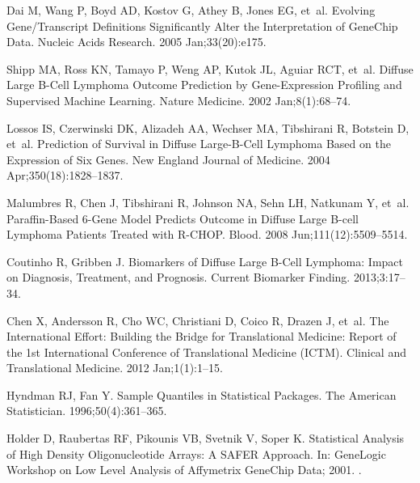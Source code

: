 \documentclass[10pt,letterpaper]{article}
\begin{document}
\begin{thebibliography}{10}
Dai M, Wang P, Boyd AD, Kostov G, Athey B, Jones EG, et~al.
\newblock Evolving {Gene/Transcript} Definitions Significantly Alter the
  Interpretation of {GeneChip} Data.
\newblock Nucleic Acids Research. 2005 Jan;33(20):e175.

Shipp MA, Ross KN, Tamayo P, Weng AP, Kutok JL, Aguiar RCT, et~al.
\newblock Diffuse Large {B}-Cell Lymphoma Outcome Prediction by Gene-Expression
  Profiling and Supervised Machine Learning.
\newblock Nature Medicine. 2002 Jan;8(1):68--74.

Lossos IS, Czerwinski DK, Alizadeh AA, Wechser MA, Tibshirani R, Botstein D,
  et~al.
\newblock Prediction of Survival in Diffuse Large-{B}-Cell Lymphoma Based on
  the Expression of Six Genes.
\newblock New England Journal of Medicine. 2004 Apr;350(18):1828--1837.

Malumbres R, Chen J, Tibshirani R, Johnson NA, Sehn LH, Natkunam Y, et~al.
\newblock Paraffin-Based 6-Gene Model Predicts Outcome in Diffuse Large
  {B}-cell Lymphoma Patients Treated with {R-CHOP}.
\newblock Blood. 2008 Jun;111(12):5509--5514.

Coutinho R, Gribben J.
\newblock Biomarkers of Diffuse Large {B}-Cell Lymphoma: Impact on Diagnosis,
  Treatment, and Prognosis.
\newblock Current Biomarker Finding. 2013;3:17--34.

Chen X, Andersson R, Cho WC, Christiani D, Coico R, Drazen J, et~al.
\newblock The International Effort: Building the Bridge for Translational
  Medicine: Report of the 1st International Conference of Translational
  Medicine {(ICTM)}.
\newblock Clinical and Translational Medicine. 2012 Jan;1(1):1--15.

Hyndman RJ, Fan Y.
\newblock Sample Quantiles in Statistical Packages.
\newblock The American Statistician. 1996;50(4):361--365.

Holder D, Raubertas RF, Pikounis VB, Svetnik V, Soper K.
\newblock Statistical Analysis of High Density Oligonucleotide Arrays: A SAFER
  Approach.
\newblock In: GeneLogic Workshop on Low Level Analysis of Affymetrix GeneChip
  Data; 2001. .

\end{thebibliography}
\end{document}
